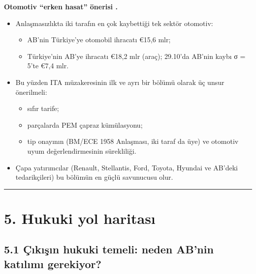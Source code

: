 \textbf{Otomotiv ``erken hasat'' önerisi \etiketH{}.}

\begin{itemize}
\tightlist
\item
  Anlaşmasızlıkta iki tarafın en çok kaybettiği tek sektör otomotiv:

  \begin{itemize}
  \tightlist
  \item
    AB'nin Türkiye'ye otomobil ihracatı €15,6 mlr;
  \item
    Türkiye'nin AB'ye ihracatı €18,2 mlr (araç); 29.10'da AB'nin kaybı σ = 5'te €7,4 mlr.
  \end{itemize}
\item
  Bu yüzden ITA müzakeresinin ilk ve ayrı bir bölümü olarak üç unsur önerilmeli:

  \begin{itemize}
  \tightlist
  \item
    sıfır tarife;
  \item
    parçalarda PEM çapraz kümülasyonu;
  \item
    tip onayının (BM/ECE 1958 Anlaşması, iki taraf da üye) ve otomotiv uyum değerlendirmesinin sürekliliği.
  \end{itemize}
\item
  Çapa yatırımcılar (Renault, Stellantis, Ford, Toyota, Hyundai ve AB'deki tedarikçileri) bu bölümün en güçlü savunucusu olur.
\end{itemize}

\begin{center}\rule{0.5\linewidth}{0.5pt}\end{center}

\hypertarget{02b_secenekler_hukuk-5-hukuki-yol-haritasux131}{%
\section{5. Hukuki yol haritası}\label{02b_secenekler_hukuk-5-hukuki-yol-haritasux131}}

\hypertarget{02b_secenekler_hukuk-51-uxe7ux131kux131ux15fux131n-hukuki-temeli-neden-abnin-katux131lux131mux131-gerekiyor}{%
\subsection{5.1 Çıkışın hukuki temeli: neden AB'nin katılımı gerekiyor?}\label{02b_secenekler_hukuk-51-uxe7ux131kux131ux15fux131n-hukuki-temeli-neden-abnin-katux131lux131mux131-gerekiyor}}

\begingroup\gbtablo\small

